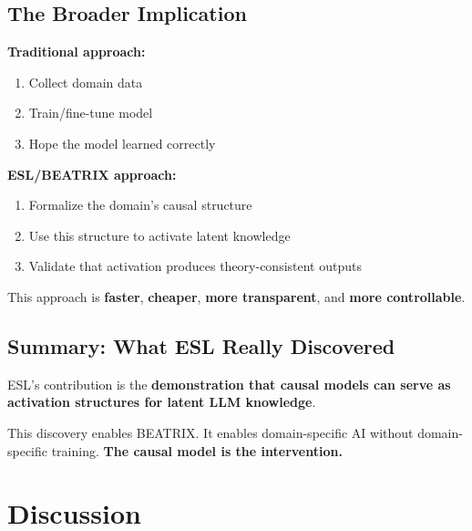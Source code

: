 \subsection{The Broader Implication}

\begin{principlebox}
\textbf{Traditional approach:}
\begin{enumerate}
    \item Collect domain data
    \item Train/fine-tune model
    \item Hope the model learned correctly
\end{enumerate}

\textbf{ESL/BEATRIX approach:}
\begin{enumerate}
    \item Formalize the domain's causal structure
    \item Use this structure to activate latent knowledge
    \item Validate that activation produces theory-consistent outputs
\end{enumerate}

This approach is \textbf{faster}, \textbf{cheaper}, \textbf{more transparent}, and \textbf{more controllable}.
\end{principlebox}


\subsection{Summary: What ESL Really Discovered}

\begin{principlebox}
ESL's contribution is the \textbf{demonstration that causal models can serve as activation structures for latent LLM knowledge}.

This discovery enables BEATRIX. It enables domain-specific AI without domain-specific training. \textbf{The causal model is the intervention.}
\end{principlebox}



\section{Discussion}

